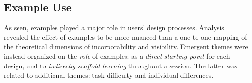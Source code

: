    

   

	



%
%
\subsection{Example Use}  %

As seen, examples played a major role in users' design processes.
Analysis revealed the effect of examples to be more nuanced than %
a one-to-one mapping of the theoretical dimensions of incorporability and visibility.
Emergent themes were instead organized on the \emph{role} of examples: %
as a \emph{direct starting point} for each design; and
to \emph{indirectly scaffold learning} throughout a session.
The latter was related to additional themes: task difficulty and individual differences.



